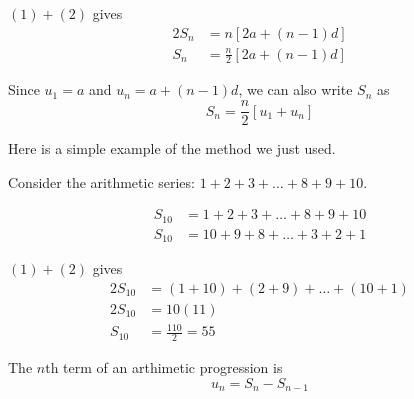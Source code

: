 \documentclass[11pt,a4paper]{book}
\begin{document}
$\left(1\right)+\left(2\right)$ gives
\begin{align*}
2S_{n} & =n\left[2a+\left(n-1\right)d\right]\\
S_{n} & =\frac{n}{2}\left[2a+\left(n-1\right)d\right]
\end{align*}

\begin{tcolorbox}[colback=blue!5, colframe=black,boxrule=.4pt, sharpish corners]

Since $u_{1}=a$ and $u_{n}=a+\left(n-1\right)d$, we can also write
$S_{n}$ as 
\[
S_{n}=\frac{n}{2}\left[u_{1}+u_{n}\right]
\]
\end{tcolorbox}

Here is a simple example of the method we just used. 

Consider the arithmetic series: $1+2+3+\ldots+8+9+10$.

\begin{align*}
S_{10} & =1+2+3+\ldots+8+9+10\tag{1}\\
S_{10} & =10+9+8+\ldots+3+2+1\tag{2}
\end{align*}

$\left(1\right)+\left(2\right)$ gives 
\begin{align*}
2S_{10} & =\left(1+10\right)+\left(2+9\right)+\ldots+\left(10+1\right)\\
2S_{10} & =10\left(11\right)\\
S_{10} & =\frac{110}{2}=55
\end{align*}

\begin{tcolorbox}[colback=blue!5, colframe=black,boxrule=.4pt, sharpish corners]

The $n\text{th}$ term of an arthimetic progression is 
\[
u_{n}=S_{n}-S_{n-1}
\]
\end{tcolorbox}
\end{document}
